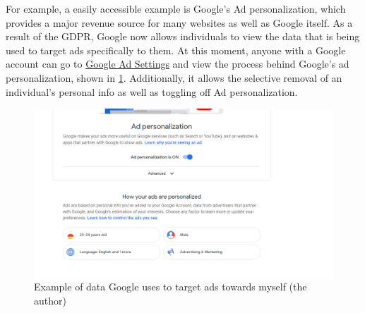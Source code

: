 \documentclass[
	letterpaper, %
]{jdf}
\begin{document}
For example, a easily accessible example is Google's Ad personalization, which provides a major revenue source for many websites as well as Google itself. As a result of the GDPR, Google now allows individuals to view the data that is being used to target ads specifically to them. At this moment, anyone with a Google account can go to \href{https://adssettings.google.com/}{Google Ad Settings} and view the process behind Google's ad personalization, shown in \ref{fig:google-ads}. Additionally, it allows the selective removal of an individual's personal info as well as toggling off Ad personalization.

\begin{figure}
	\centering
	\includegraphics[width=0.7\linewidth]{../figures/google-ads}
	\caption{Example of data Google uses to target ads towards myself (the author)}
	\label{fig:google-ads}
\end{figure}
\end{document}

